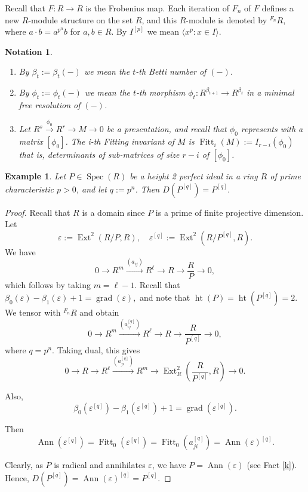 \documentclass[11pt,a4paper]{amsart}
\numberwithin{equation}{section}
\newtheorem{notation}[theorem]{Notation}
\newtheorem{example}[theorem]{Example}
\DeclareMathOperator{\Fitt}{Fitt}
\DeclareMathOperator{\Spec}{Spec}
\DeclareMathOperator{\Ext}{Ext}
\newcommand{\up}[1]{{{}^{#1}\!}}
\newcommand{\lo}{\longrightarrow}
\begin{document}
Recall that
$F:R\to R$ is the Frobenius map. Each iteration of $F_n$ of $F$ defines a new $R$-module structure on the set $R$, and this $R$-module is denoted by $\up{F_n}R$, where $a\cdot b = a^{p^{n}}b$ for $a, b \in R$. By $I^{[p]}$ we mean $\langle x^p:x\in I\rangle$.
\begin{notation}
	\begin{enumerate}
		\item[(i)] By
		$\beta_t:=\beta_t(-)$ we mean the $t$-th Betti number of $(-)$.
		\item[(ii)]By
		$\phi_t:=\phi_t(-)$ we mean the $t$-th morphism $\phi_t:R^{\beta_{t+1}}\to R^{\beta_{t}}$ in a minimal free resolution of $(-)$.
		
		\item[(iii)] Let $ R^s \stackrel{\phi_0}\lo R^r\to M \to0$ be a presentation, and recall that ${\phi_0}$ represents with a matrix $[{\phi_0}]$. The i-th Fitting invariant of $M$ is  
		$\Fitt_i(M) := I_{r-i}({\phi_0})$ that is, determinants of sub-matrices of size $r-i$ of $[{\phi_0}]$.\end{enumerate}
\end{notation}
\begin{example}\label{two}
	Let $P\in\Spec(R)$ be a height 2 perfect ideal in a ring $R$ of prime characteristic $p > 0$, and let $q := p^n$. Then
	\(
	D({P^{[q]}})
	= P^{[q]}.
	\)\end{example}


\begin{proof}
	Recall that $R$ is a domain since $P$ is a prime of finite projective dimension.
	Let
	\[
	\varepsilon := \Ext^2(R/P, R), \quad \varepsilon^{[q]} := \Ext^2(R/P^{[q]}, R).
	\]
	We have
	\[
	0\longrightarrow R^m \xrightarrow{(a_{ij})} R^\ell \longrightarrow R \longrightarrow \frac{R}{P} \longrightarrow 0,
	\]
	which follows by taking $m = \ell-1$.
	Recall that
	\(
	\beta_0(\varepsilon) - \beta_1(\varepsilon) + 1 = \operatorname{grad}(\varepsilon),
	\)
	and note that
	\(\operatorname{ht}(P)=
	\operatorname{ht}(P^{[q]}) = 2.
	\)
	We tensor with $\up{F_n}R $ and obtain
	\[
	0\longrightarrow R^m \xrightarrow{(a_{ij}^{[q]})} R^\ell \longrightarrow R
	\longrightarrow \frac{R}{P^{[q]}} \longrightarrow 0,
	\]where $q=p^n$.
	Taking dual, 
	this gives
	\[
	0 \longrightarrow R \longrightarrow R^\ell \xrightarrow{(a_{ji}^{[q]})} R^m
	\longrightarrow \operatorname{Ext}^2_R\! (\frac{R}{P^{[q]}}, R )
	\longrightarrow 0.
	\]
	
	
	Also,
	\[
	\beta_0(\varepsilon^{[q]}) - \beta_1(\varepsilon^{[q]}) + 1
	= \operatorname{grad}(\varepsilon^{[q]}).
	\]
	
	Then
	\[
	\operatorname{Ann}(\varepsilon^{[q]})
	= \operatorname{Fitt}_0(\varepsilon^{[q]})
	= \operatorname{Fitt}_0(a_{ji}^{[q]})
	= \operatorname{Ann}(\varepsilon)^{[q]}.
	\]
	
	Clearly, as $P$ is radical and annihilates $\varepsilon$, we have
	\(
	P = \operatorname{Ann}(\varepsilon) 
	\) (see Fact \ref{k}).
	Hence, \(	D({P^{[q]}})
	=  \operatorname{Ann}(\varepsilon)^{[q]}=P^{[q]}.
	\)
\end{proof}
\end{document}
